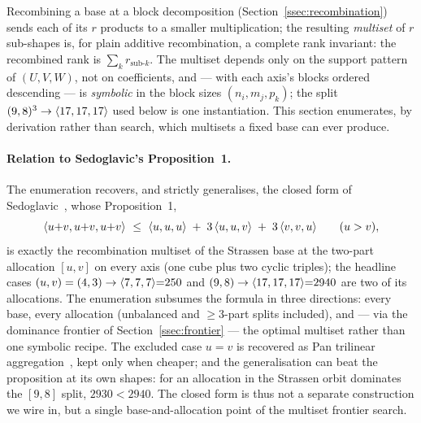 
Recombining a base at a block decomposition
(Section~\ref{ssec:recombination}) sends each of its \(r\) products to a
smaller multiplication; the resulting \emph{multiset} of \(r\) sub-shapes
is, for plain additive recombination, a complete rank invariant: the
recombined rank is \(\sum_k r_{\text{sub-}k}\). The multiset depends only
on the support pattern of \((U,V,W)\), not on coefficients, and --- with
each axis's blocks ordered descending --- is \emph{symbolic} in the block
sizes \((n_i,m_j,p_k)\); the split \((9,8)^3\to\langle 17, 17, 17 \rangle\) used
below is one instantiation. This section enumerates, by derivation rather
than search, which multisets a fixed base can ever produce.

\paragraph{Relation to Sedoglavic's Proposition~1.}
The enumeration recovers, and strictly generalises, the closed form of
Sedoglavic~\cite{sedoglavic2017}, whose Proposition~1,
\[
  \langle u{+}v, u{+}v, u{+}v \rangle\ \le\
  \langle u, u, u \rangle\;+\;3\,\langle u, u, v \rangle\;+\;3\,\langle v, v, u \rangle
  \qquad(u>v),
\]
is exactly the recombination multiset of the Strassen 
base at the two-part allocation \([u,v]\) on every axis (one cube plus two
cyclic triples); the headline cases
\((u,v)=(4,3)\to\langle 7, 7, 7 \rangle{=}250\) and
\((9,8)\to\langle 17, 17, 17 \rangle{=}2940\) are two of its allocations. The
enumeration subsumes the formula in three directions: every base, every
allocation (unbalanced and \(\ge3\)-part splits included), and --- via the
dominance frontier of Section~\ref{ssec:frontier} --- the optimal multiset
rather than one symbolic recipe. The excluded case \(u=v\) is recovered as
Pan trilinear aggregation~\cite{pan1978}, kept only when cheaper; and the
generalisation can beat the proposition at its own shapes: for
 an allocation in the Strassen orbit dominates the
\([9,8]\) split, \(2930<2940\). The closed form is thus not a separate
construction we wire in, but a single base-and-allocation point of the
multiset frontier search.

